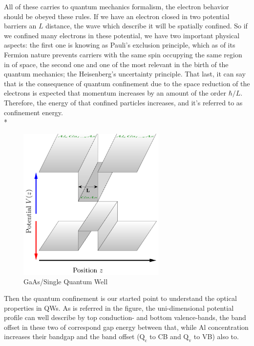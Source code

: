 All of these carries to quantum mechanics formalism, the electron behavior should be obeyed these rules. If we have an electron closed in two potential barriers  an $L$ distance, the wave which describe it will be spatially confined.
So if we confined many electrons in these potential,  we have two important physical aspects: the first one is knowing as Pauli's exclusion principle, which as of its Fermion nature prevents carriers with the same spin occupying the same region in of space\cite{harrison2016quantum,pauli1925zusammenhang}, the second one and one of the most relevant in the birth of the quantum mechanics; the Heisenberg's uncertainty principle. 
That last, it can say  that is the consequence of quantum confinement due to the space reduction of the electrons is expected that momentum increases by an amount of the order $\hbar/L$. Therefore, the energy of that confined particles increases, and it's referred to as confinement energy\cite{cardona2005fundamentals}. \\*
\begin{figure}
	\centering
	\includegraphics[width=0.65\textwidth]{../figures/chapter-1/heterostructures/out/qw1}
	\caption{GaAs/\algaas Single Quantum Well }
	\label{fig:subsection-1.2-single-quantum-well-scheme}
\end{figure}
Then the quantum confinement is our started point to understand the optical properties in QWs. As is referred in the figure, the uni-dimensional potential profile can well describe by top conduction- and bottom valence-bands, the band offset in these two of correspond gap energy between that, while Al concentration increases their bandgap and the band offset ($\mathrm{Q_{c}}$ to CB and $\mathrm{Q_{v}}$ to VB) also to.   


